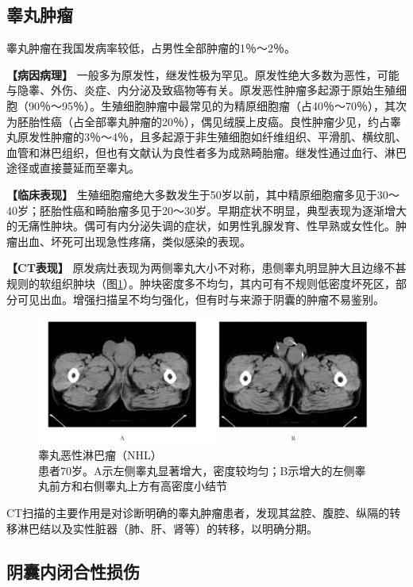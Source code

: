 \subsection{睾丸肿瘤}

睾丸肿瘤在我国发病率较低，占男性全部肿瘤的1％～2％。

\textbf{【病因病理】}
一般多为原发性，继发性极为罕见。原发性绝大多数为恶性，可能与隐睾、外伤、炎症、内分泌及致癌物等有关。原发恶性肿瘤多起源于原始生殖细胞（90％～95％）。生殖细胞肿瘤中最常见的为精原细胞瘤（占40％～70％），其次为胚胎性癌（占全部睾丸肿瘤的20％），偶见绒膜上皮癌。良性肿瘤少见，约占睾丸原发性肿瘤的3％～4％，且多起源于非生殖细胞如纤维组织、平滑肌、横纹肌、血管和淋巴组织，但也有文献认为良性者多为成熟畸胎瘤。继发性通过血行、淋巴途径或直接蔓延而至睾丸。

\textbf{【临床表现】}
生殖细胞瘤绝大多数发生于50岁以前，其中精原细胞瘤多见于30～40岁；胚胎性癌和畸胎瘤多见于20～30岁。早期症状不明显，典型表现为逐渐增大的无痛性肿块。偶可有内分泌失调的症状，如男性乳腺发育、性早熟或女性化。肿瘤出血、坏死可出现急性疼痛，类似感染的表现。

\textbf{【CT表现】}
原发病灶表现为两侧睾丸大小不对称，患侧睾丸明显肿大且边缘不甚规则的软组织肿块（图\ref{fig21-7}）。肿块密度多不均匀，其内可有不规则低密度坏死区，部分可见出血。增强扫描呈不均匀强化，但有时与来源于阴囊的肿瘤不易鉴别。

\begin{figure}[!htbp]
 \centering
 \includegraphics[width=.7\textwidth,height=\textheight,keepaspectratio]{./images/Image00403.jpg}
 \captionsetup{justification=centering}
 \caption{睾丸恶性淋巴瘤（NHL）\\{\small 患者70岁。A示左侧睾丸显著增大，密度较均匀；B示增大的左侧睾丸前方和右侧睾丸上方有高密度小结节}}
 \label{fig21-7}
  \end{figure} 

CT扫描的主要作用是对诊断明确的睾丸肿瘤患者，发现其盆腔、腹腔、纵隔的转移淋巴结以及实性脏器（肺、肝、肾等）的转移，以明确分期。

\subsection{阴囊内闭合性损伤}

